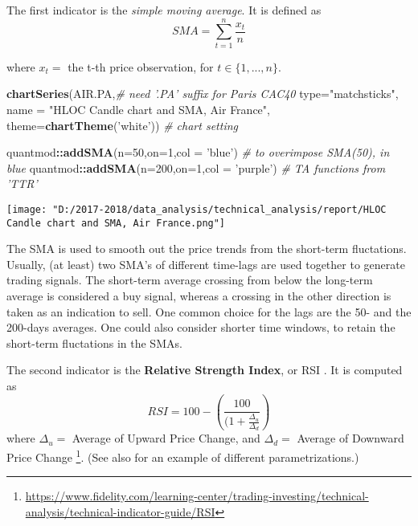 \documentclass[
  11pt,
]{article}
\newenvironment{Shaded}{\begin{snugshade}}{\end{snugshade}}
\newcommand{\CommentTok}[1]{\textcolor[rgb]{0.56,0.35,0.01}{\textit{#1}}}
\newcommand{\DataTypeTok}[1]{\textcolor[rgb]{0.13,0.29,0.53}{#1}}
\newcommand{\DecValTok}[1]{\textcolor[rgb]{0.00,0.00,0.81}{#1}}
\newcommand{\KeywordTok}[1]{\textcolor[rgb]{0.13,0.29,0.53}{\textbf{#1}}}
\newcommand{\NormalTok}[1]{#1}
\newcommand{\OperatorTok}[1]{\textcolor[rgb]{0.81,0.36,0.00}{\textbf{#1}}}
\newcommand{\StringTok}[1]{\textcolor[rgb]{0.31,0.60,0.02}{#1}}
\let\origfigure\figure
\let\endorigfigure\endfigure
\renewenvironment{figure}[1][2] {
    \expandafter\origfigure\expandafter[H]
} {
    \endorigfigure
}
\begin{document}
The first indicator is the \emph{simple moving average}. It is defined
as \begin{equation} 
SMA = \displaystyle \sum_{t=1}^{n} \frac{x_t}{n} 
\end{equation}

where \(x_t =\) the t-th price observation, for \(t \in \{1,...,n\}\).

\begin{Shaded}
\begin{Highlighting}[]
\KeywordTok{chartSeries}\NormalTok{(AIR.PA,}\CommentTok{# need '.PA' suffix for Paris CAC40}
            \DataTypeTok{type=}\StringTok{"matchsticks"}\NormalTok{,}
            \DataTypeTok{name =} \StringTok{"HLOC Candle chart and SMA, Air France"}\NormalTok{,}
            \DataTypeTok{theme=}\KeywordTok{chartTheme}\NormalTok{(}\StringTok{'white'}\NormalTok{)) }\CommentTok{# chart setting}

\NormalTok{quantmod}\OperatorTok{::}\KeywordTok{addSMA}\NormalTok{(}\DataTypeTok{n=}\DecValTok{50}\NormalTok{,}\DataTypeTok{on=}\DecValTok{1}\NormalTok{,}\DataTypeTok{col =} \StringTok{'blue'}\NormalTok{) }\CommentTok{# to overimpose SMA(50), in blue}
\NormalTok{quantmod}\OperatorTok{::}\KeywordTok{addSMA}\NormalTok{(}\DataTypeTok{n=}\DecValTok{200}\NormalTok{,}\DataTypeTok{on=}\DecValTok{1}\NormalTok{,}\DataTypeTok{col =} \StringTok{'purple'}\NormalTok{) }\CommentTok{# TA functions from 'TTR' }
\end{Highlighting}
\end{Shaded}

\begin{figure}
\centering
\texttt{[image: "D:/2017-2018/data\_analysis/technical\_analysis/report/HLOC Candle chart and SMA, Air France.png"]}
\caption{Daily HLOC Chart price, with SMA(50) in blu, and SMA(200) in
purple.}
\end{figure}

The SMA is used to smooth out the price trends from the short-term
fluctations. Usually, (at least) two SMA's of different time-lags are
used together to generate trading signals. The short-term average
crossing from below the long-term average is considered a buy signal,
whereas a crossing in the other direction is taken as an indication to
sell. One common choice for the lags are the 50- and the 200-days
averages. One could also consider shorter time windows, to retain the
short-term fluctations in the SMAs.

The second indicator is the \textbf{Relative Strength Index}, or RSI .
It is computed as\\
\begin{equation} 
RSI = 100 - \left( \frac{100}{(1 + \frac{\Delta_u}{\Delta_d} } \right) 
\end{equation} where \(\Delta_u =\) Average of Upward Price Change, and
\(\Delta_d =\) Average of Downward Price Change \footnote{\url{https://www.fidelity.com/learning-center/trading-investing/technical-analysis/technical-indicator-guide/RSI}}.
(See also \citet{Hsu2016} for an example of different parametrizations.)
\end{document}
